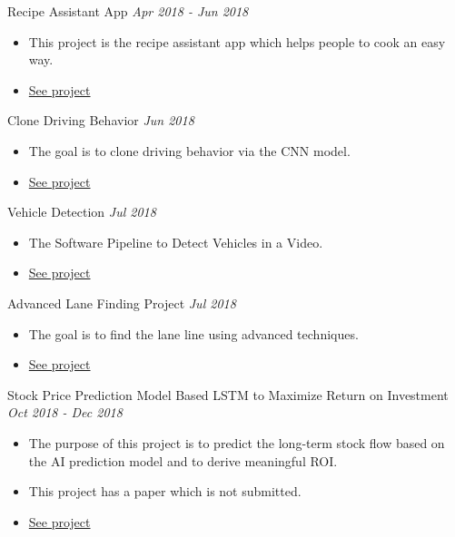 \documentclass[10pt]{article}
\newenvironment{changemargin}[2]{
  \begin{list}{}{
    \setlength{\topsep}{0pt}
    \setlength{\leftmargin}{#1}
    \setlength{\rightmargin}{#2}
    \setlength{\listparindent}{\parindent}
    \setlength{\itemindent}{\parindent}
    \setlength{\parsep}{\parskip}
  }
  \item[]}{\end{list}
}
\newcommand{\project}[2]{
	{#1} \hfill \emph{#2}\\ \medskip
}
\newenvironment{body} {
	\vspace*{-16pt}
	\begin{changemargin}{-0.25in}{-0.5in}
  }
	{\end{changemargin}
}
\begin{document}
\begin{body}
\project{Recipe Assistant App}{Apr 2018 - Jun 2018}
\begin{itemize} \itemsep -0pt  %
      \item  This project is the recipe assistant app which helps people to cook an easy way.
      \item \href{https://github.com/jeongwhanchoi/recipe-assistant-app}{See project}
  	\end{itemize}
	
		
\project{Clone Driving  Behavior}{Jun 2018}
\begin{itemize} \itemsep -0pt  %
      \item  The goal is to clone driving behavior via the CNN model.
      \item \href{https://github.com/jeongwhanchoi/CarND-Behavioral-Cloning}{See project}
  	\end{itemize}
	
\project{Vehicle Detection}{Jul 2018}
\begin{itemize} \itemsep -0pt  %
      \item  The Software Pipeline to Detect Vehicles in a Video.
      \item \href{https://github.com/jeongwhanchoi/CarND-Vehicle-Detection}{See project}
  	\end{itemize}
	
\project{Advanced Lane Finding Project}{Jul 2018}
\begin{itemize} \itemsep -0pt  %
      \item  The goal is to find the lane line using advanced techniques.
      \item \href{https://github.com/jeongwhanchoi/CarND-Advanced-Lane-Lines}{See project}
  	\end{itemize}
	
\project{Stock Price Prediction Model Based LSTM to Maximize Return on Investment}{Oct 2018 - Dec 2018}
\begin{itemize} \itemsep -0pt  %
      \item  The purpose of this project is to predict the long-term stock flow based on the AI prediction model and to derive meaningful ROI.
      \item This project has a paper which is not submitted.
      \item \href{https://drive.google.com/file/d/1Fp3WmoBpHpYU13fNWS1vbQSzmBCR3MIu/view}{See project}
  	\end{itemize}
	

\end{body}
\end{document}
